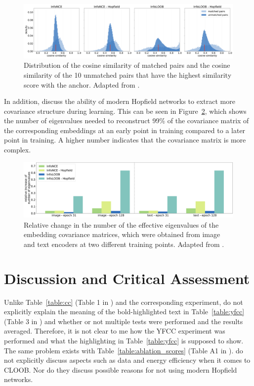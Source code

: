 \documentclass{scrarticle}
\begin{document}
\begin{figure}[H]
  \begin{center}
    \includegraphics[width=\textwidth]{ablation}
  \end{center}
  \caption{Distribution of the cosine similarity of matched pairs and the cosine similarity of the 10 unmatched pairs that have the highest similarity score with the anchor. Adapted from \citet{cloob}.}
  \label{fig:ablation_density}
\end{figure}

In addition, \citet{cloob} discuss the ability of modern Hopfield networks to extract more covariance structure during learning. This can be seen in Figure~\ref{fig:eigenvalues}, which shows the number of eigenvalues needed to reconstruct 99\% of the covariance matrix of the corresponding embeddings at an early point in training compared to a later point in training. A higher number indicates that the covariance matrix is more complex.

\begin{figure}[H]
  \begin{center}
    \includegraphics[width=\textwidth]{eigenvalues}
  \end{center}
  \caption{Relative change in the number of the effective eigenvalues of the embedding covariance matrices, which were obtained from image and text encoders at two different training points. Adapted from \citet{cloob}.}
  \label{fig:eigenvalues}
\end{figure}

\section{Discussion and Critical Assessment}

Unlike Table~\ref{table:cc} (Table 1 in \citet{cloob}) and the corresponding experiment, \citet{cloob} do not explicitly explain the meaning of the bold-highlighted text in Table~\ref{table:yfcc} (Table 3 in \citet{cloob}) and whether or not multiple tests were performed and the results averaged. Therefore, it is not clear to me how the YFCC experiment was performed and what the highlighting in Table~\ref{table:yfcc} is supposed to show. The same problem exists with Table~\ref{table:ablation_scores} (Table A1 in \citet{cloob}). \citet{cloob} do not explicitly discuss aspects such as data and energy efficiency when it comes to CLOOB. Nor do they discuss possible reasons for not using modern Hopfield networks.
\end{document}
